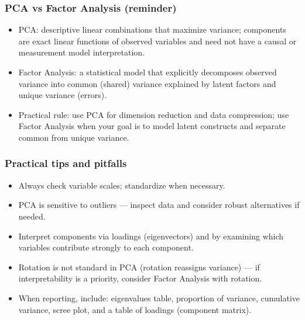 \documentclass[aspectratio=169]{beamer}
\begin{document}
\begin{frame}
\frametitle{PCA vs Factor Analysis (reminder)}
\begin{itemize}
    \item PCA: descriptive linear combinations that maximize variance; components are exact linear functions of observed variables and need not have a causal or measurement model interpretation.
    \item Factor Analysis: a statistical model that explicitly decomposes observed variance into common (shared) variance explained by latent factors and unique variance (errors).
    \item Practical rule: use PCA for dimension reduction and data compression; use Factor Analysis when your goal is to model latent constructs and separate common from unique variance.
\end{itemize}
\end{frame}

\begin{frame}
\frametitle{Practical tips and pitfalls}
\begin{itemize}
    \item Always check variable scales; standardize when necessary.
    \item PCA is sensitive to outliers — inspect data and consider robust alternatives if needed.
    \item Interpret components via loadings (eigenvectors) and by examining which variables contribute strongly to each component.
    \item Rotation is not standard in PCA (rotation reassigns variance) — if interpretability is a priority, consider Factor Analysis with rotation.
    \item When reporting, include: eigenvalues table, proportion of variance, cumulative variance, scree plot, and a table of loadings (component matrix).
\end{itemize}
\end{frame}
\end{document}
